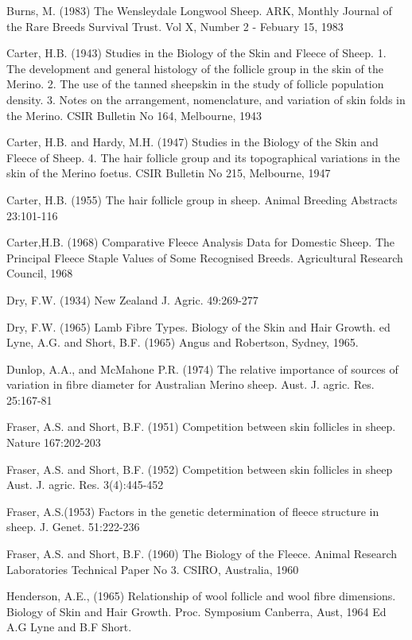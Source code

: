 \documentclass[titlepage]{article}  %
\begin{document}
\begin{thebibliography}{99}
Burns, M. (1983) The Wensleydale Longwool Sheep. ARK, Monthly Journal of the Rare Breeds Survival Trust. Vol X, Number 2 - Febuary 15, 1983

Carter, H.B. (1943) Studies in the Biology of the Skin and Fleece of Sheep. 1. The development and general histology of the follicle group in the skin of the Merino. 2. The use of the tanned sheepskin in the study of follicle population density. 3. Notes on the arrangement, nomenclature, and variation of skin folds in the Merino. CSIR Bulletin No 164, Melbourne, 1943

Carter, H.B. and Hardy, M.H. (1947) Studies in the Biology of the Skin and Fleece of Sheep. 4. The hair follicle group and its topographical variations in the skin of the Merino foetus. CSIR Bulletin No 215, Melbourne, 1947

Carter, H.B. (1955) The hair follicle group in sheep.  Animal Breeding Abstracts 23:101-116

Carter,H.B. (1968) Comparative Fleece Analysis Data for Domestic Sheep. The Principal Fleece Staple Values of Some Recognised Breeds. Agricultural Research Council, 1968


Dry, F.W. (1934) New Zealand J. Agric. 49:269-277

Dry, F.W. (1965) Lamb Fibre Types. Biology of the Skin and Hair Growth. ed Lyne, A.G. and Short, B.F. (1965) Angus and Robertson, Sydney, 1965.

Dunlop, A.A., and McMahone P.R. (1974)  The relative importance of sources of variation in fibre diameter for Australian Merino sheep. Aust. J. agric. Res. 25:167-81

Fraser, A.S. and Short, B.F. (1951) Competition between skin follicles in sheep. Nature 167:202-203

Fraser, A.S. and Short, B.F. (1952) Competition between skin follicles in sheep Aust. J. agric. Res. 3(4):445-452

Fraser, A.S.(1953) Factors in the genetic determination of fleece structure in sheep. J. Genet. 51:222-236

Fraser, A.S. and Short, B.F. (1960) The Biology of the Fleece. Animal Research Laboratories Technical Paper No 3. CSIRO, Australia, 1960

Henderson, A.E., (1965) Relationship of wool follicle and wool fibre dimensions. Biology of Skin and Hair Growth. Proc. Symposium Canberra, Aust, 1964 Ed A.G Lyne and B.F Short.


\end{thebibliography}
\end{document}
